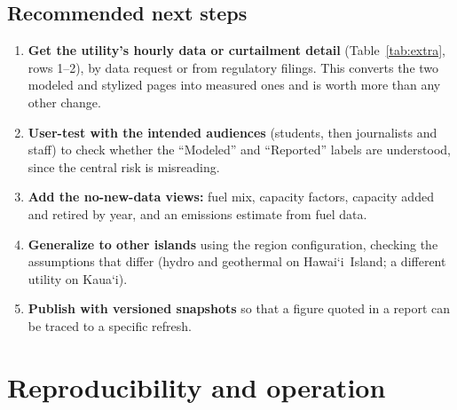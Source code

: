 \documentclass[11pt,a4paper]{article}
\newcommand{\okina}{\textquoteleft}
\newcommand{\Hawaii}{\texorpdfstring{Hawai\okina i}{Hawaii}}
\begin{document}
\subsection{Recommended next steps}
\begin{enumerate}
\item \textbf{Get the utility's hourly data or curtailment detail} (Table~\ref{tab:extra}, rows 1--2), by data request or from
 regulatory filings. This converts the two modeled and stylized pages into measured ones and is worth more
 than any other change.
\item \textbf{User-test with the intended audiences} (students, then journalists and staff) to check whether the
 ``Modeled'' and ``Reported'' labels are understood, since the central risk is misreading.
\item \textbf{Add the no-new-data views:} fuel mix, capacity factors, capacity added and retired by year, and an
 emissions estimate from fuel data.
\item \textbf{Generalize to other islands} using the region configuration, checking the assumptions that differ
 (hydro and geothermal on \Hawaii\ Island; a different utility on Kaua\okina i).
\item \textbf{Publish with versioned snapshots} so that a figure quoted in a report can be traced to a specific
 refresh.
\end{enumerate}

\section{Reproducibility and operation}
\label{sec:repro}
\end{document}
